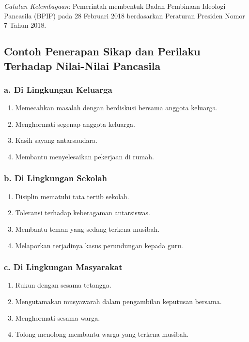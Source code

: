 \textit{Catatan Kelembagaan}: Pemerintah membentuk Badan Pembinaan Ideologi Pancasila (BPIP) pada 28 Februari 2018 berdasarkan Peraturan Presiden Nomor 7 Tahun 2018.

\subsection{Contoh Penerapan Sikap dan Perilaku Terhadap Nilai-Nilai Pancasila}

\subsubsection{a. Di Lingkungan Keluarga}
\begin{enumerate}
    \item Memecahkan masalah dengan berdiskusi bersama anggota keluarga.
    \item Menghormati segenap anggota keluarga.
    \item Kasih sayang antarsaudara.
    \item Membantu menyelesaikan pekerjaan di rumah.
\end{enumerate}

\subsubsection{b. Di Lingkungan Sekolah}
\begin{enumerate}
    \item Disiplin mematuhi tata tertib sekolah.
    \item Toleransi terhadap keberagaman antarsiswas.
    \item Membantu teman yang sedang terkena musibah.
    \item Melaporkan terjadinya kasus perundungan kepada guru.
\end{enumerate}

\subsubsection{c. Di Lingkungan Masyarakat}
\begin{enumerate}
    \item Rukun dengan sesama tetangga.
    \item Mengutamakan musyawarah dalam pengambilan keputusan bersama.
    \item Menghormati sesama warga.
    \item Tolong-menolong membantu warga yang terkena musibah.
\end{enumerate}

